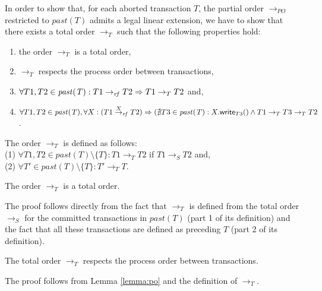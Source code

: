 In order to show that, for each aborted transaction $T$, 
the partial order $\rightarrow_{PO}$ restricted to
$\mathit{past(T)}$ admits a legal linear extension, 
we have to show that there exists a total order $\rightarrow_T$ such that
the following properties hold:
\begin{enumerate}
\vspace{-0.2cm}
\item the order $\rightarrow_T$ is a total order,
\vspace{-0.2cm}
\item $\rightarrow_T$ respects the process order between transactions,
\vspace{-0.2cm}
\item $\forall T1, T2 \in \mathit{past(T)}: 
T1 \stackrel{}{\rightarrow}_{\mathit{rf}} T2 \Rightarrow T1 \rightarrow_T T2$ and,
\vspace{-0.2cm}
\item $\forall T1, T2 \in \mathit{past(T)}, \forall X: (T1 \stackrel{X}{\rightarrow}_{\mathit{rf}} T2)
\Rightarrow (\nexists T3 \in \mathit{past(T)}:
         X.{\sf write}_{T3}() \wedge T1 \rightarrow_T T3 \rightarrow_T T2$.
\end{enumerate}


\noindent
The order $\rightarrow_T$ is defined as follows:\\
(1) $\forall T1, T2 \in \mathit{past(T)} \setminus \{T\}:
     T1 \rightarrow_T T2$ if $T1 \rightarrow_S T2$ and,\\
(2) $\forall T' \in \mathit{past(T)} \setminus \{T\}:
T' \rightarrow_T T$.

\begin{lemma}
\label{lemma:total2}
The order $\rightarrow_T$ is a total order.
\end{lemma}
\begin{proofL}
 The proof follows directly from the  fact that  $\rightarrow_T$
is defined from the total order  $\rightarrow_S$ for the committed 
transactions in $\mathit{past(T)}$ (part 1 of its definition)
and the fact that all these transactions are defined as 
preceding $T$  (part 2 of its definition).


\renewcommand{\toto}{lemma:total2}
\end{proofL}

\begin{lemma}
\label{lemma:po2}
The total order $\rightarrow_T$ respects the process order between transactions.
\end{lemma}
\begin{proofL}
The proof follows from Lemma \ref{lemma:po} and the definition of 
$\rightarrow_T$.
\renewcommand{\toto}{lemma:po2}
\end{proofL}

